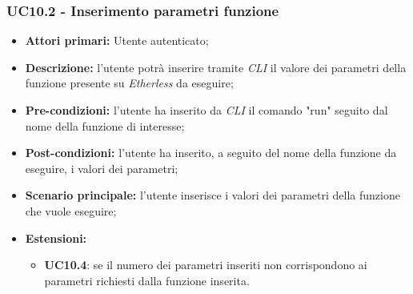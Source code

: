 \subsubsection{UC10.2 - Inserimento parametri funzione}
\begin{itemize}
	\item \textbf{Attori primari:} Utente autenticato;
	\item \textbf{Descrizione:} l'utente potrà inserire tramite \textit{CLI\glo} il valore dei parametri della funzione presente su \textit{Etherless} da eseguire; 
	\item \textbf{Pre-condizioni:} l'utente ha inserito da \textit{CLI\glo} il comando "run" seguito dal nome della funzione di interesse;
	\item \textbf{Post-condizioni:} l'utente ha inserito, a seguito del nome della funzione da eseguire, i valori dei parametri;
	\item \textbf{Scenario principale:} l'utente inserisce i valori dei parametri della funzione che vuole eseguire;
	\item \textbf{Estensioni:} 
	\begin{itemize}
		\item \textbf{UC10.4}: se il numero dei parametri inseriti non corrispondono ai parametri richiesti dalla funzione inserita.
	\end{itemize}
\end{itemize}